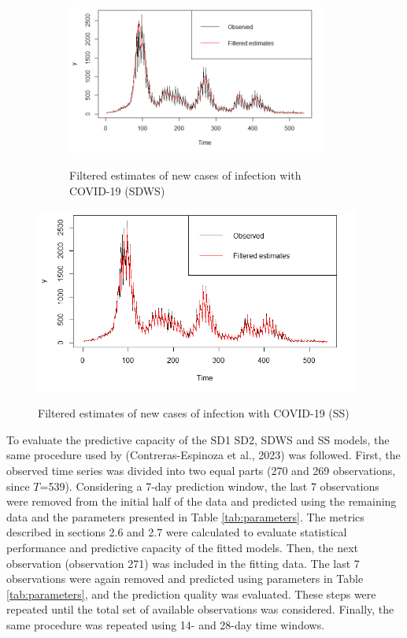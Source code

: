 \begin{figure}
\centering
\begin{subfigure}{\textwidth}
\caption{Filtered estimates of new cases of infection with COVID-19 (SDWS)}
\includegraphics[width=0.95\textwidth, inner]{SDWS_plot.png}
\label{fig:SD1}
\end{subfigure}
\begin{subfigure}
    \caption{Filtered estimates of new cases of infection with COVID-19 (SS)}
\includegraphics[width=0.95\textwidth, inner]{SS_plot.png}
\label{fig:SD2}
\end{subfigure}
\end{figure}

To evaluate the predictive capacity of the SD1 SD2, SDWS and SS models, the same procedure used by (Contreras-Espinoza et al., 2023) was followed. First, the observed time series was divided into two equal parts (270 and 269 observations, since $T$=539). Considering a 7-day prediction window, the last 7 observations were removed from the initial half of the data and predicted using the remaining data and the parameters presented in Table \ref{tab:parameters}. The metrics described in sections 2.6 and 2.7 were calculated to evaluate statistical performance and predictive capacity of the fitted models. Then, the next observation (observation 271) was included in the fitting data. The last 7 observations were again removed and predicted using parameters in Table \ref{tab:parameters}, and the prediction quality was evaluated. These steps were repeated until the total set of available observations was considered. Finally, the same procedure was repeated using 14- and 28-day time windows. \\

